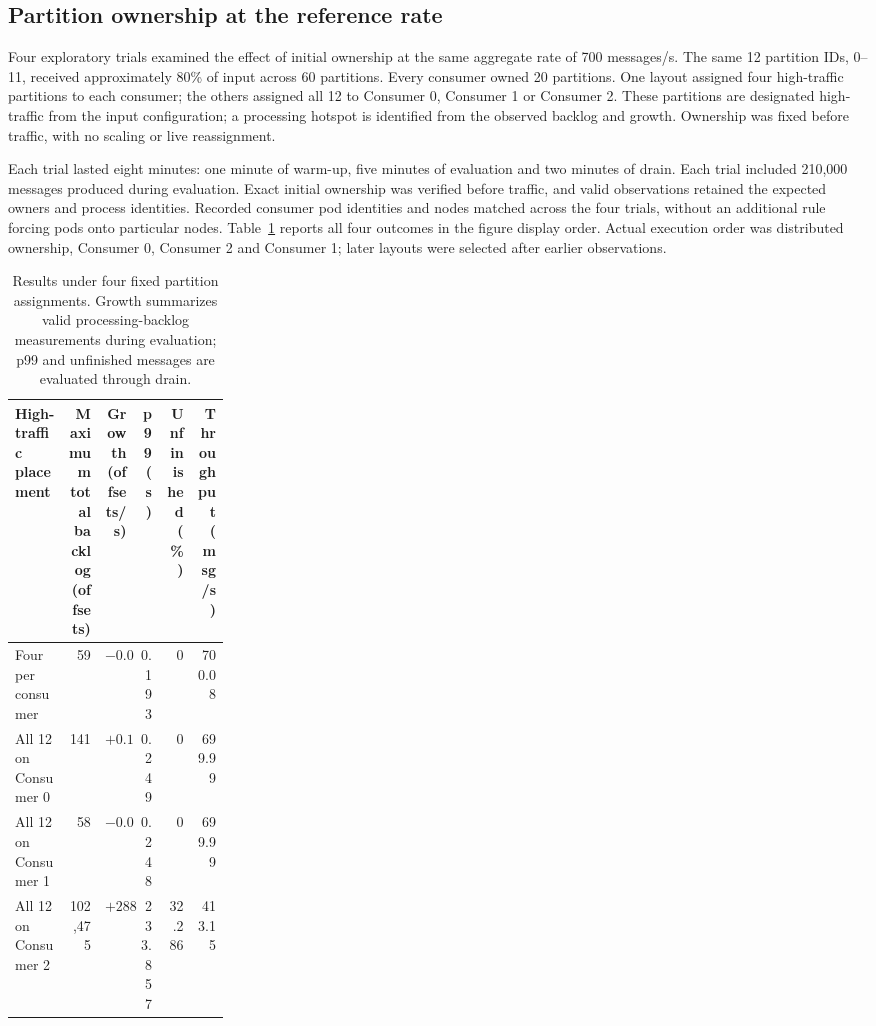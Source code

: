 \documentclass[10pt]{article}
\begin{document}
\subsection{Partition ownership at the reference rate}
\label{app:ownership-calibration-details}

Four exploratory trials examined the effect of initial ownership at the same aggregate rate of 700 messages/s. The same 12 partition IDs, 0--11, received approximately 80\% of input across 60 partitions. Every consumer owned 20 partitions. One layout assigned four high-traffic partitions to each consumer; the others assigned all 12 to Consumer 0, Consumer 1 or Consumer 2. These partitions are designated high-traffic from the input configuration; a processing hotspot is identified from the observed backlog and growth. Ownership was fixed before traffic, with no scaling or live reassignment.

Each trial lasted eight minutes: one minute of warm-up, five minutes of evaluation and two minutes of drain. Each trial included 210,000 messages produced during evaluation. Exact initial ownership was verified before traffic, and valid observations retained the expected owners and process identities. Recorded consumer pod identities and nodes matched across the four trials, without an additional rule forcing pods onto particular nodes. Table~\ref{tab:ownership-reference-outcomes} reports all four outcomes in the figure display order. Actual execution order was distributed ownership, Consumer 0, Consumer 2 and Consumer 1; later layouts were selected after earlier observations.

\begin{table}[!htbp]
\centering\small
\setlength{\tabcolsep}{3pt}
\renewcommand{\arraystretch}{1.2}
\begin{tabular}{@{}p{0.25\linewidth}rrrrr@{}}
\toprule
\textbf{High-traffic placement} & \shortstack{\textbf{Maximum total}\\\textbf{backlog (offsets)}} & \shortstack{\textbf{Growth}\\\textbf{(offsets/s)}} & \shortstack{\textbf{p99}\\\textbf{(s)}} & \shortstack{\textbf{Unfinished}\\\textbf{(\%)}} & \shortstack{\textbf{Throughput}\\\textbf{(msg/s)}}\\
\midrule
Four per consumer & 59 & $-0.020$ & 0.193 & 0 & 700.08\\
All 12 on Consumer 0 & 141 & $+0.154$ & 0.249 & 0 & 699.99\\
All 12 on Consumer 1 & 58 & $-0.013$ & 0.248 & 0 & 699.99\\
All 12 on Consumer 2 & 102,475 & $+288.319$ & 233.857 & 32.286 & 413.15\\
\bottomrule
\end{tabular}
\caption{Results under four fixed partition assignments. Growth summarizes valid processing-backlog measurements during evaluation; p99 and unfinished messages are evaluated through drain.}
\label{tab:ownership-reference-outcomes}
\end{table}
\end{document}
